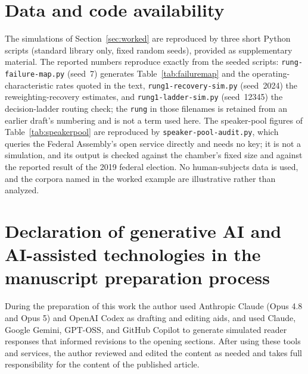 \documentclass[12pt]{article}
\begin{document}
\section*{Data and code availability}
The simulations of Section~\ref{sec:worked} are reproduced by three short Python scripts (standard library only, fixed random seeds), provided as supplementary material. The reported numbers reproduce exactly from the seeded scripts: \texttt{rung-failure-map.py} (seed~7) generates Table~\ref{tab:failuremap} and the operating-characteristic rates quoted in the text, \texttt{rung1-recovery-sim.py} (seed~2024) the reweighting-recovery estimates, and \texttt{rung1-ladder-sim.py} (seed~12345) the decision-ladder routing check; the \texttt{rung} in those filenames is retained from an earlier draft's numbering and is not a term used here. The speaker-pool figures of Table~\ref{tab:speakerpool} are reproduced by \texttt{speaker-pool-audit.py}, which queries the Federal Assembly's open service directly and needs no key; it is not a simulation, and its output is checked against the chamber's fixed size and against the reported result of the 2019 federal election. No human-subjects data is used, and the corpora named in the worked example are illustrative rather than analyzed.

\section*{Declaration of generative AI and AI-assisted technologies in the manuscript preparation process}
During the preparation of this work the author used Anthropic Claude (Opus 4.8 and Opus 5) and OpenAI Codex as drafting and editing aids, and used Claude, Google Gemini, GPT-OSS, and GitHub Copilot to generate simulated reader responses that informed revisions to the opening sections. After using these tools and services, the author reviewed and edited the content as needed and takes full responsibility for the content of the published article.

\clearpage
\printbibliography
\end{document}
